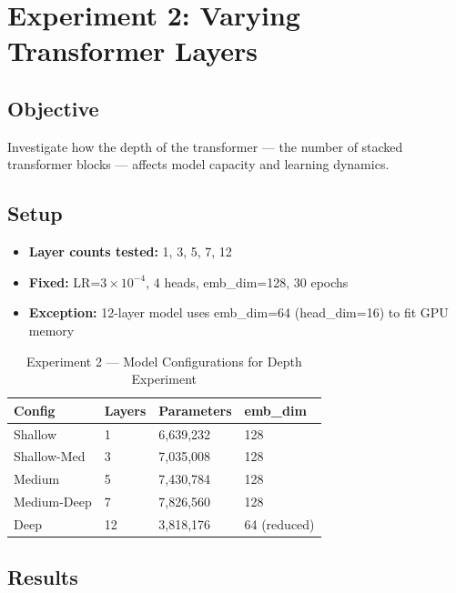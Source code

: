 \documentclass[12pt,a4paper]{article}
\begin{document}
\newpage
\section{Experiment 2: Varying Transformer Layers}

\subsection{Objective}

Investigate how the depth of the transformer — the number of stacked transformer blocks — affects model capacity and learning dynamics.

\subsection{Setup}

\begin{itemize}[leftmargin=1.8cm]
  \item \textbf{Layer counts tested:} 1, 3, 5, 7, 12
  \item \textbf{Fixed:} LR=$3\times10^{-4}$, 4 heads, emb\_dim=128, 30 epochs
  \item \textbf{Exception:} 12-layer model uses emb\_dim=64 (head\_dim=16) to fit GPU memory
\end{itemize}

\begin{table}[H]
\centering
\caption{Experiment 2 — Model Configurations for Depth Experiment}
\renewcommand{\arraystretch}{1.3}
\begin{tabular}{C{2cm}C{2cm}C{3cm}C{3.5cm}}
  \toprule
  \textbf{Config} & \textbf{Layers} & \textbf{Parameters} & \textbf{emb\_dim} \\
  \midrule
  Shallow         & 1  & 6,639,232 & 128 \\
  Shallow-Med     & 3  & 7,035,008 & 128 \\
  Medium          & 5  & 7,430,784 & 128 \\
  Medium-Deep     & 7  & 7,826,560 & 128 \\
  Deep            & 12 & 3,818,176 & 64 (reduced) \\
  \bottomrule
\end{tabular}
\end{table}

\subsection{Results}
\end{document}
